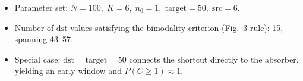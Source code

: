 \begin{itemize}
  \item Parameter set: $N=100,\;K=6,\;n_0=1,\;\mathrm{target}=50,\;\mathrm{src}=6$.
  \item Number of $\mathrm{dst}$ values satisfying the bimodality criterion (Fig.~3 rule): 15, spanning 43--57.
  \item Special case: $\mathrm{dst}=\mathrm{target}=50$ connects the shortcut directly to the absorber, yielding an early window and $P(C\geq 1)\approx 1$.
\end{itemize}

